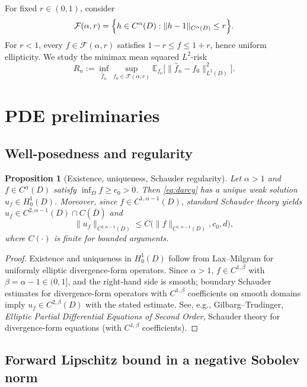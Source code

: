 \documentclass[11pt]{article}
\newtheorem{proposition}{Proposition}
\newcommand{\D}{D}
\begin{document}
For fixed $r\in(0,1)$, consider
\[
\mathcal F(\alpha,r)=\Bigl\{h\in C^\alpha(\D): \|h-1\|_{C^\alpha(\D)}\le r\Bigr\}.
\]
For $r<1$, every $f\in\mathcal F(\alpha,r)$ satisfies $1-r\le f\le 1+r$, hence uniform ellipticity. We study the minimax mean squared $L^2$-risk
\begin{equation}\label{eq:minimax}
R_n := \inf_{\hat f_n}\sup_{f_0\in\mathcal F(\alpha,r)}\mathbb E_{f_0}\bigl[\|\hat f_n-f_0\|_{L^2(\D)}^2\bigr].
\end{equation}

\section{PDE preliminaries}

\subsection{Well-posedness and regularity}

\begin{proposition}[Existence, uniqueness, Schauder regularity]\label{prop:wellposed}
Let $\alpha>1$ and $f\in C^\alpha(\D)$ satisfy $\inf_\D f\ge c_0>0$. Then \eqref{eq:darcy} has a unique weak solution $u_f\in H^1_0(\D)$. Moreover, since $f\in C^{1,\alpha-1}(\D)$, standard Schauder theory yields $u_f\in C^{2,\alpha-1}(\D)\cap C(\overline\D)$ and
\[
\|u_f\|_{C^{2,\alpha-1}(\D)}\le C\bigl(\|f\|_{C^{1,\alpha-1}(\D)},c_0,d\bigr),
\]
where $C(\cdot)$ is finite for bounded arguments.
\end{proposition}

\begin{proof}
Existence and uniqueness in $H^1_0(\D)$ follow from Lax--Milgram for uniformly elliptic divergence-form operators.
Since $\alpha>1$, $f\in C^{1,\beta}$ with $\beta=\alpha-1\in(0,1]$, and the right-hand side is smooth; boundary Schauder estimates for divergence-form operators with $C^{1,\beta}$ coefficients on smooth domains imply $u_f\in C^{2,\beta}(\D)$ with the stated estimate. See, e.g., Gilbarg--Trudinger, \emph{Elliptic Partial Differential Equations of Second Order}, Schauder theory for divergence-form equations (with $C^{1,\beta}$ coefficients).
\end{proof}

\subsection{Forward Lipschitz bound in a negative Sobolev norm}
\end{document}
